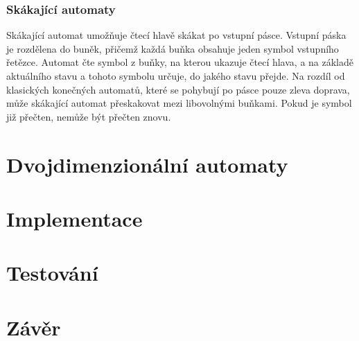 \subsection{Skákající automaty}

Skákající automat umožňuje čtecí hlavě skákat po vstupní pásce. Vstupní páska
je rozdělena do buněk, přičemž každá buňka obsahuje jeden symbol vstupního
řetězce. Automat čte symbol z buňky, na kterou ukazuje čtecí hlava, a na
základě aktuálního stavu a tohoto symbolu určuje, do jakého stavu přejde. Na
rozdíl od klasických konečných automatů, které se pohybují po pásce pouze zleva
doprava, může skákající automat přeskakovat mezi libovolnými buňkami. Pokud je
symbol již přečten, nemůže být přečten znovu.

\chapter{Dvojdimenzionální automaty}

\chapter{Implementace}

\chapter{Testování}

\chapter{Závěr}


%
